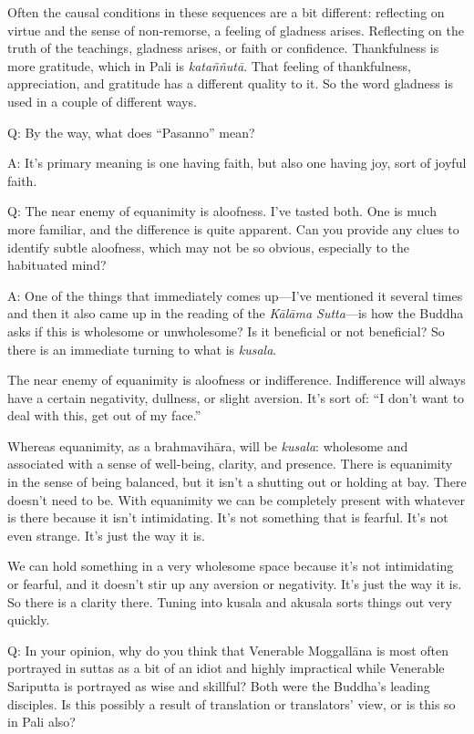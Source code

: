 Often the causal conditions in these sequences are a bit different:
reflecting on virtue and the sense of non-remorse, a feeling of gladness
arises. Reflecting on the truth of the teachings, gladness arises, or
faith or confidence. Thankfulness is more gratitude, which in Pali is
\emph{kataññutā}. That feeling of thankfulness, appreciation, and
gratitude has a different quality to it. So the word gladness is used in
a couple of different ways.

\qaspace
Q: By the way, what does “Pasanno” mean?

\qaspace
A: It’s primary meaning is one having faith, but also one having joy,
sort of joyful faith.

\qaspace
Q: The near enemy of equanimity is aloofness. I’ve tasted both. One is
much more familiar, and the difference is quite apparent. Can you
provide any clues to identify subtle aloofness, which may not be so
obvious, especially to the habituated mind?

\qaspace
A: One of the things that immediately comes up—I’ve mentioned it several
times and then it also came up in the reading of the \emph{Kālāma
Sutta}—is how the Buddha asks if this is wholesome or unwholesome? Is it
beneficial or not beneficial? So there is an immediate turning to what
is \emph{kusala}.

The near enemy of equanimity is aloofness or indifference. Indifference
will always have a certain negativity, dullness, or slight aversion.
It’s sort of: “I don’t want to deal with this, get out of my face.”

Whereas equanimity, as a brahmavihāra, will be \emph{kusala}: wholesome
and associated with a sense of well-being, clarity, and presence. There
is equanimity in the sense of being balanced, but it isn’t a shutting
out or holding at bay. There doesn’t need to be. With equanimity we can
be completely present with whatever is there because it isn’t
intimidating. It’s not something that is fearful. It’s not even strange.
It’s just the way it is.

We can hold something in a very wholesome space because it’s not
intimidating or fearful, and it doesn’t stir up any aversion or
negativity. It’s just the way it is. So there is a clarity there. Tuning
into kusala and akusala sorts things out very quickly.

\qaspace
Q: In your opinion, why do you think that Venerable Moggallāna is most
often portrayed in suttas as a bit of an idiot and highly impractical
while Venerable Sariputta is portrayed as wise and skillful? Both were
the Buddha’s leading disciples. Is this possibly a result of translation
or translators’ view, or is this so in Pali also?

